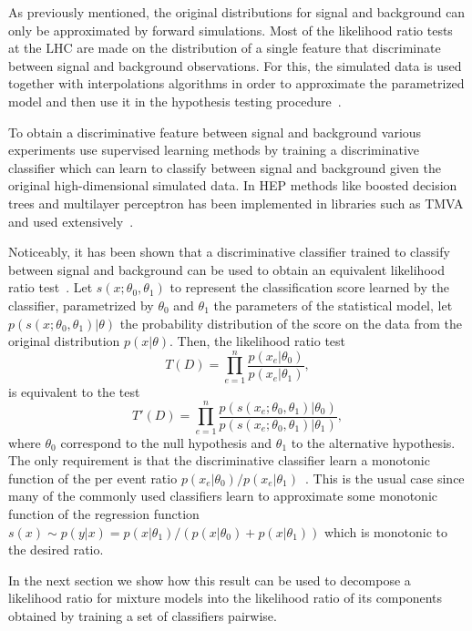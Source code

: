 \documentclass[11pt, oneside]{article}   	%
\begin{document}
As previously mentioned, the original distributions for signal and background can only be approximated by forward simulations. Most of the likelihood ratio tests at the LHC are made on the distribution of a single feature that discriminate between signal and background observations. For this, the simulated data is used together with interpolations algorithms in order to approximate the parametrized model and then use it in the hypothesis testing procedure~\citep{Cranmer:2012sba}.

To obtain a discriminative feature between signal and background various experiments use supervised learning methods by training a discriminative classifier which can learn to classify between signal and background given the original high-dimensional simulated data. In HEP methods like boosted decision trees and multilayer perceptron has been implemented in libraries such as TMVA and used extensively~\citep{Hocker:2007ht}.

Noticeably, it has been shown that a discriminative classifier trained to classify between signal and background can be used to obtain an equivalent likelihood ratio test~\citep{Cranmer2015}. Let  $s(x;\theta_0, \theta_1)$ to represent the classification score learned by the classifier, parametrized by $\theta_0$ and $\theta_1$ the parameters of the statistical model, let $p( s({x; \theta_0, \theta_1}) | \theta )$ the probability distribution of the score on the data from the original distribution $p(x | \theta)$. Then, the likelihood ratio test
\begin{equation}
T(D) = \prod_{e=1}^n \frac{ p(x_e | \theta_0)}{ p(x_e | \theta_1)},
\end{equation}
is equivalent to the test 
\begin{equation}\label{eq:lrtest}
T'(D) = \prod_{e=1}^n \frac{ p(s(x_e; \theta_0, \theta_1) | \theta_0)}{ p(s(x_e; \theta_0, \theta_1) | \theta_1)},
\end{equation}
where $\theta_0$ correspond to the null hypothesis and $\theta_1$ to the alternative hypothesis. The only requirement is that the discriminative classifier learn a monotonic function of the per event ratio $p(x_e | \theta_0) / p(x_e | \theta_1)$~\citep{Cranmer2015}. This is the usual case since many of the commonly used classifiers learn to approximate some monotonic function of the regression function $s(x) \sim p(y|x) = p(x|\theta_1) / (p(x|\theta_0) + p(x|\theta_1))$ which is monotonic to the desired ratio. %
 
 In the next section we show how this result can be used to decompose a likelihood ratio for mixture models into the likelihood ratio of its components obtained by training a set of classifiers pairwise.
 
\end{document}
